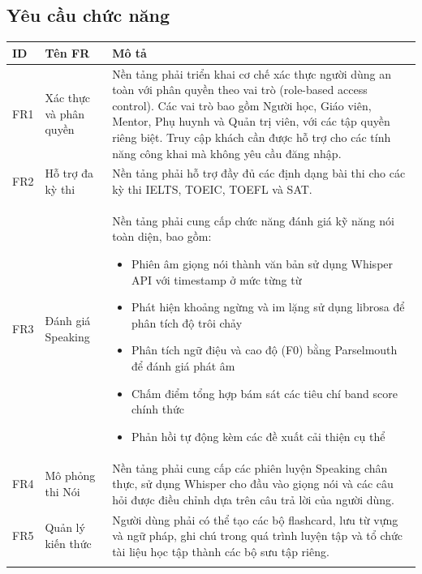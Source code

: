 \subsection{Yêu cầu chức năng}
{
\renewcommand{\arraystretch}{1.5} %
\begin{tabularx}{\textwidth}{|l|l|X|}
\hline
\textbf{ID} & \textbf{Tên FR} & \textbf{Mô tả} \\ \hline
FR1 & Xác thực và phân quyền & Nền tảng phải triển khai cơ chế xác thực người dùng an toàn với phân quyền theo vai trò (role-based access control). Các vai trò bao gồm Người học, Giáo viên, Mentor, Phụ huynh và Quản trị viên, với các tập quyền riêng biệt. Truy cập khách cần được hỗ trợ cho các tính năng công khai mà không yêu cầu đăng nhập. \\ \hline
FR2 & Hỗ trợ đa kỳ thi & Nền tảng phải hỗ trợ đầy đủ các định dạng bài thi cho các kỳ thi IELTS, TOEIC, TOEFL và SAT. \\ \hline
FR3 & Đánh giá Speaking &
\begin{minipage}[t]{\linewidth}
Nền tảng phải cung cấp chức năng đánh giá kỹ năng nói toàn diện, bao gồm:
\begin{itemize}
    \item Phiên âm giọng nói thành văn bản sử dụng Whisper API với timestamp ở mức từng từ
    \item Phát hiện khoảng ngừng và im lặng sử dụng librosa để phân tích độ trôi chảy
    \item Phân tích ngữ điệu và cao độ (F0) bằng Parselmouth để đánh giá phát âm
    \item Chấm điểm tổng hợp bám sát các tiêu chí band score chính thức
    \item Phản hồi tự động kèm các đề xuất cải thiện cụ thể
\end{itemize}
\end{minipage} \\ \hline
FR4 & Mô phỏng thi Nói & Nền tảng phải cung cấp các phiên luyện Speaking chân thực, sử dụng Whisper cho đầu vào giọng nói và các câu hỏi được điều chỉnh dựa trên câu trả lời của người dùng. \\ \hline
FR5 & Quản lý kiến thức & Người dùng phải có thể tạo các bộ flashcard, lưu từ vựng và ngữ pháp, ghi chú trong quá trình luyện tập và tổ chức tài liệu học tập thành các bộ sưu tập riêng. \\ \hline
\caption{Bảng yêu cầu chức năng}
\end{tabularx}}



